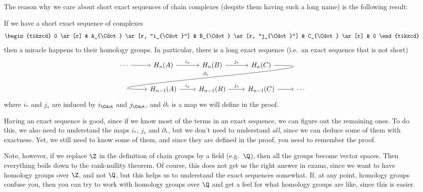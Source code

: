 \documentclass[a4paper]{article}
\begin{document}
The reason why we care about short exact sequences of chain complexes (despite them having such a long name) is the following result:
\begin{thm}
  If we have a short exact sequence of complexes
  \[
    \begin{tikzcd}
      0 \ar[r] & A_{\Cdot} \ar [r, "i_{\Cdot}"] & B_{\Cdot} \ar [r, "j_{\Cdot}"] & C_{\Cdot} \ar[r] & 0
    \end{tikzcd}
  \]
  then a miracle happens to their homology groups. In particular, there is a long exact sequence (i.e.\ an exact sequence that is not short)
  \[
    \begin{tikzcd}
      \cdots \ar [r] & H_n(A) \ar[r, "i_*"] & H_n(B) \ar[r, "j_*"] & H_n(C) \ar[out=0, in=180, looseness=2, overlay, dll, "\partial_*"']\\
      & H_{n - 1}(A) \ar[r, "i_*"] & H_{n - 1}(B) \ar[r, "j_*"] & H_{n - 1}(C) \ar [r] & \cdots
    \end{tikzcd}
  \]
  where $i_*$ and $j_*$ are induced by $i_{\Cdot}$ and $j_{\Cdot}$, and $\partial_*$ is a map we will define in the proof.
\end{thm}
Having an exact sequence is good, since if we know most of the terms in an exact sequence, we can figure out the remaining ones. To do this, we also need to understand the maps $i_*$, $j_*$ and $\partial_*$, but we don't need to understand \emph{all}, since we can deduce some of them with exactness. Yet, we still need to know some of them, and since they are defined in the proof, you need to remember the proof.

Note, however, if we replace $\Z$ in the definition of chain groups by a field (e.g.\ $\Q$), then all the groups become vector spaces. Then everything boils down to the rank-nullity theorem. Of course, this does not get us the right answer in exams, since we want to have homology groups over $\Z$, and not $\Q$, but this helps us to understand the exact sequences somewhat. If, at any point, homology groups confuse you, then you can try to work with homology groups over $\Q$ and get a feel for what homology groups are like, since this is easier.
\end{document}
